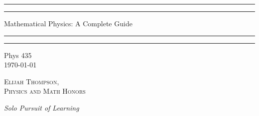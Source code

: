\documentclass[12pt, a4paper, oneside, openright, titlepage]{book}
\begin{document}

\begin{titlepage}
    \centering
    \scshape
    \vspace*{\baselineskip}
    \rule{\textwidth}{1.6pt}\vspace*{-\baselineskip}\vspace*{2pt}
    \rule{\textwidth}{0.4pt}
    
    \vspace{0.75\baselineskip}
    
    {\LARGE Mathematical Physics: A Complete Guide}
    
    \vspace{0.75\baselineskip}
    
    \rule{\textwidth}{0.4pt}\vspace*{-\baselineskip}\vspace{3.2pt}
    \rule{\textwidth}{1.6pt}
    
    \vspace{2\baselineskip}
    Phys 435 \\
    \vspace*{3\baselineskip}
    \monthdayyeardate\today \\
    \vspace*{5.0\baselineskip}
    
    {\scshape\Large Elijah Thompson, \\ Physics and Math Honors\\}
    
    \vspace{1.0\baselineskip}
    \textit{Solo Pursuit of Learning}
    \vfill
    \enlargethispage{1in}
    \begin{figure}[b!]
    \end{figure}
\end{titlepage}
\end{document}
